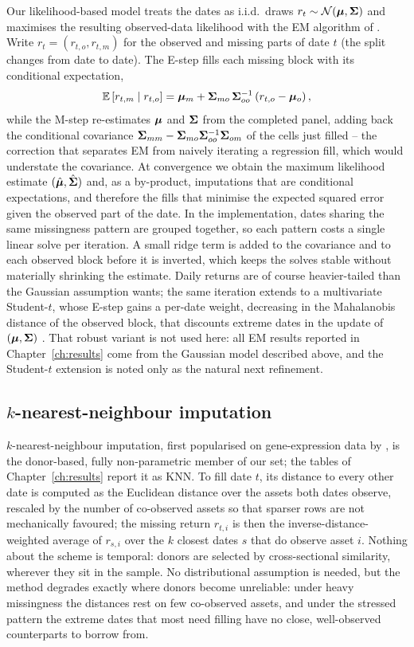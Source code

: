 Our likelihood-based model treats the dates as i.i.d.\ draws
$r_t \sim \mathcal{N}(\boldsymbol{\mu}, \boldsymbol{\Sigma})$ and maximises the resulting
observed-data likelihood with the EM algorithm of \citet{dempster1977}.
Write $r_t = (r_{t,o}, r_{t,m})$ for the observed and missing parts of date
$t$ (the split changes from date to date). The E-step fills each missing
block with its conditional expectation,
\[
\mathbb{E}\left[r_{t,m} \mid r_{t,o}\right]
= \boldsymbol{\mu}_m + \boldsymbol{\Sigma}_{mo}\,\boldsymbol{\Sigma}_{oo}^{-1}\left(r_{t,o} - \boldsymbol{\mu}_o\right),
\]
while the M-step re-estimates $\boldsymbol{\mu}$ and $\boldsymbol{\Sigma}$ from the completed panel,
adding back the conditional covariance
$\boldsymbol{\Sigma}_{mm} - \boldsymbol{\Sigma}_{mo}\boldsymbol{\Sigma}_{oo}^{-1}\boldsymbol{\Sigma}_{om}$ of the cells just
filled -- the correction that separates EM from naively iterating a
regression fill, which would understate the covariance. At convergence we
obtain the maximum likelihood estimate $(\hat{\boldsymbol{\mu}}, \hat{\boldsymbol{\Sigma}})$ and, as
a by-product, imputations that are conditional expectations, and therefore the
fills that minimise the expected squared error given the observed part of the
date. In the implementation, dates sharing the same
missingness pattern are grouped together, so each pattern costs a single
linear solve per iteration. A small ridge term is added to the covariance and to
each observed block before it is inverted, which keeps the solves stable without
materially shrinking the estimate. Daily returns are of course heavier-tailed
than the Gaussian assumption wants; the same iteration extends to a multivariate
Student-$t$, whose E-step gains a per-date weight, decreasing in the Mahalanobis
distance of the observed block, that discounts extreme dates in the update of
$(\boldsymbol{\mu}, \boldsymbol{\Sigma})$ \citep{little1988, liu1995}. That robust variant is not used
here: all EM results reported in Chapter~\ref{ch:results} come from the Gaussian
model described above, and the Student-$t$ extension is noted only as the natural
next refinement.

\subsection{$k$-nearest-neighbour imputation}

$k$-nearest-neighbour imputation, first popularised on gene-expression data
by \citet{troyanskaya2001}, is the donor-based, fully non-parametric member
of our set; the tables of Chapter~\ref{ch:results} report it as KNN. To fill date $t$, its distance to every other date is computed
as the Euclidean distance over the assets both dates observe, rescaled by
the number of co-observed assets so that sparser rows are not mechanically
favoured; the missing return $r_{t,i}$ is then the inverse-distance-weighted
average of $r_{s,i}$ over the $k$ closest dates $s$ that do observe asset
$i$. Nothing about the scheme is temporal: donors are selected by
cross-sectional similarity, wherever they sit in the sample. No
distributional assumption is needed, but the method degrades exactly where
donors become unreliable: under heavy missingness the distances rest on few
co-observed assets, and under the stressed pattern the extreme dates that
most need filling have no close, well-observed counterparts to borrow from.

